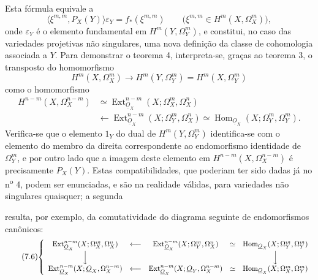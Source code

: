 \documentclass[11pt,twoside,openany]{book}
\numberwithin{equation}{section}
\newcommand{\src}[1]{%
  \phantomsection\hypertarget{src:#1}{}%
  \marginpar{\raggedleft\footnotesize\sffamily #1}%
}
\newcommand{\Osh}{\underline{O}}
\theoremstyle{plain}
\theoremstyle{definition}
\theoremstyle{remark}
\newcommand{\FgaUnitKey}{frontmatter}
\renewcommand{\src}[1]{%
  \phantomsection\hypertarget{src:\FgaUnitKey:#1}{}%
  \marginpar{\raggedleft\footnotesize\sffamily #1}%
}
\begin{document}
Esta fórmula equivale a
\begin{equation}\tag{7.4 bis}
  \bigl\langle\xi^{m,m},P_X(Y)\bigr\rangle\varepsilon_Y
  =f_{*}(\xi^{m,m})
  \qquad
  \bigl(\xi^{m,m}\in H^{m}(X,\Omega_X^{m})\bigr),
\end{equation}
 onde
$\varepsilon_Y$ é o elemento fundamental em $H^{m}(Y,\Omega_Y^{m})$, e
constitui, no caso das variedades projetivas não singulares, uma nova
definição da classe de cohomologia associada a $Y$. Para demonstrar o
teorema 4, interpreta-se, graças ao teorema 3, o transposto do homomorfismo
\[
  H^{m}(X,\Omega_X^{m})
  \longrightarrow H^{m}(Y,\Omega_Y^{m})
  =H^{m}(X,\Omega_Y^{m})
\]
como o homomorfismo
\begin{equation}\tag{7.5}
\begin{split}
  H^{n-m}(X,\Omega_X^{n-m})
  &\simeq
  \operatorname{Ext}_{\Osh_X}^{n-m}(X;\Omega_X^{m},\Omega_X^{n})\\
  &\longleftarrow
  \operatorname{Ext}_{\Osh_X}^{n-m}(X;\Omega_Y^{m},\Omega_X^{n})
  \simeq
  \operatorname{Hom}_{\Osh_X}(X;\Omega_Y^{m},\Omega_Y^{m}).
\end{split}
\end{equation}
Verifica-se que o elemento $1_Y$ do dual de $H^{m}(Y,\Omega_Y^{m})$ identifica-se
com o elemento do membro da direita correspondente ao endomorfismo identidade de
$\Omega_Y^{m}$, e por outro lado que a imagem deste elemento em
$H^{n-m}(X,\Omega_X^{n-m})$ é precisamente $P_X(Y)$. Estas compatibilidades, que poderiam
ter sido dadas já no n\textsuperscript{o} 4, podem ser enunciadas, e são
na realidade válidas, para variedades não singulares quaisquer; a segunda

\src{189}
resulta, por exemplo, da comutatividade do diagrama seguinte de endomorfismos
canônicos:
\begin{equation}\tag{7.6}
\resizebox{\textwidth}{!}{$
\left\{
\begin{array}{ccccc}
\operatorname{Ext}_{\Osh_X}^{n-m}(X;\Omega_X^{m},\Omega_X^{n})
&\longleftarrow&
\operatorname{Ext}_{\Osh_X}^{n-m}(X;\Omega_Y^{m},\Omega_X^{n})
&\simeq&
\operatorname{Hom}_{\Osh_X}(X;\Omega_Y^{m},\Omega_Y^{m})\\[3pt]
\Big\downarrow&&&&\Big\downarrow\\[3pt]
\operatorname{Ext}_{\Osh_X}^{n-m}(X;\Osh_X,\Omega_X^{n-m})
&\longleftarrow&
\operatorname{Ext}_{\Osh_X}^{n-m}(X;\Osh_Y,\Omega_X^{n-m})
&\simeq&
\operatorname{Hom}_{\Osh_X}(X;\Omega_X^{m},\Omega_Y^{m})
\end{array}
\right.
$}
\end{equation}
\end{document}
